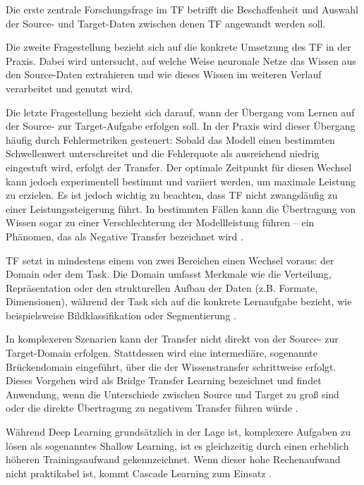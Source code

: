 Die erste zentrale Forschungsfrage im TF betrifft die Beschaffenheit und Auswahl der Source- und Target-Daten zwischen denen TF 
angewandt werden soll. 

Die zweite Fragestellung bezieht sich auf die konkrete Umsetzung des TF in der Praxis. Dabei wird untersucht, auf welche Weise neuronale Netze 
das Wissen aus den Source-Daten extrahieren und wie dieses Wissen im weiteren Verlauf verarbeitet und genutzt wird.

Die letzte Fragestellung bezieht sich darauf, wann der Übergang vom Lernen auf der Source- zur 
Target-Aufgabe erfolgen soll. In der Praxis wird dieser Übergang häufig durch Fehlermetriken gesteuert: Sobald das Modell einen bestimmten 
Schwellenwert unterschreitet und die Fehlerquote als ausreichend niedrig eingestuft wird, erfolgt der Transfer. Der optimale 
Zeitpunkt für diesen Wechsel kann jedoch experimentell bestimmt und variiert werden, um maximale Leistung zu erzielen. Es ist jedoch wichtig 
zu beachten, dass TF nicht zwangsläufig zu einer Leistungssteigerung führt. In bestimmten Fällen kann die Übertragung von Wissen 
sogar zu einer Verschlechterung der Modellleistung führen – ein Phänomen, das als Negative Transfer bezeichnet wird \cite{survey_transfer}.

TF setzt in mindestens einem von zwei Bereichen einen Wechsel voraus: der Domain oder dem Task. Die Domain umfasst Merkmale 
wie die Verteilung, Repräsentation oder den strukturellen Aufbau der Daten (z.B. Formate, Dimensionen), während der Task sich auf die konkrete 
Lernaufgabe bezieht, wie beispielsweise Bildklassifikation oder Segmentierung \cite{survey_transfer}.

In komplexeren Szenarien kann der Transfer nicht direkt von der Source- zur Target-Domain erfolgen. Stattdessen wird eine intermediäre, sogenannte 
Brückendomain eingeführt, über die der Wissenstransfer schrittweise erfolgt. Dieses Vorgehen wird als Bridge Transfer Learning 
bezeichnet und findet Anwendung, wenn die Unterschiede zwischen Source und Target zu groß sind oder die direkte Übertragung zu 
negativem Transfer führen würde \cite{bridge_transfer, survey_transfer}.

Während Deep Learning grundsätzlich in der Lage ist, komplexere Aufgaben zu lösen als sogenanntes Shallow Learning, ist es gleichzeitig durch 
einen erheblich höheren Trainingsaufwand gekennzeichnet. Wenn dieser hohe Rechenaufwand nicht praktikabel ist, kommt Cascade Learning zum 
Einsatz \cite{cascor}.

